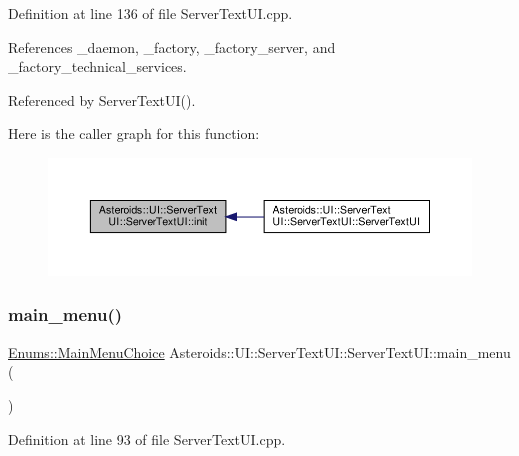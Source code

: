 Definition at line 136 of file Server\+Text\+U\+I.\+cpp.



References \+\_\+daemon, \+\_\+factory, \+\_\+factory\+\_\+server, and \+\_\+factory\+\_\+technical\+\_\+services.



Referenced by Server\+Text\+U\+I().

Here is the caller graph for this function\+:\nopagebreak
\begin{figure}[H]
\begin{center}
\leavevmode
\includegraphics[width=350pt]{classAsteroids_1_1UI_1_1ServerTextUI_1_1ServerTextUI_aa01e964f791e5ea9840f7a49a3e55736_icgraph}
\end{center}
\end{figure}
\mbox{\label{classAsteroids_1_1UI_1_1ServerTextUI_1_1ServerTextUI_afc4ba344c4244c2650ade2148e08d5f2}} 
\subsubsection{\texorpdfstring{main\+\_\+menu()}{main\_menu()}}
{\footnotesize\ttfamily \hyperlink{namespaceAsteroids_1_1UI_1_1ServerTextUI_1_1Enums_ab80731b6b7455a57d7247f6ac859af32}{Enums\+::\+Main\+Menu\+Choice} Asteroids\+::\+U\+I\+::\+Server\+Text\+U\+I\+::\+Server\+Text\+U\+I\+::main\+\_\+menu (\begin{DoxyParamCaption}{ }\end{DoxyParamCaption})\hspace{0.3cm}{\ttfamily [private]}}



Definition at line 93 of file Server\+Text\+U\+I.\+cpp.




